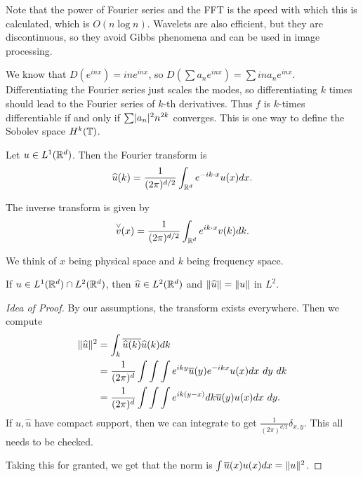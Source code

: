 \documentclass[10pt, twoside]{article}
\begin{document}
    Note that the power of Fourier series and the FFT is the speed with which
    this is calculated, which is $O(n \log n)$. Wavelets are also efficient,
    but they are discontinuous, so they avoid Gibbs phenomena and can be used
    in image processing.

    We know that $D(e^{inx}) = ine^{inx}$, so $D(\sum a_n e^{inx}) = \sum ina_n
    e^{inx}$. Differentiating the Fourier series just scales the modes, so
    differentiating $k$ times should lead to the Fourier series of $k$-th
    derivatives. Thus $f$ is $k$-times differentiable if and only if $\sum
    \lvert a_n\rvert^2 n^{2k}$ converges. This is one way to define the Sobolev space
    $H^k(\mathbb{T})$.

    \begin{defn} Let $u \in L^1(\mathbb{R}^d)$. Then the Fourier
        transform is \[\widehat{u}(k) = \frac{1}{(2\pi)^{d/2}} \int_{\mathbb{R}^d}
        e^{-ik\cdot x} u(x) dx.\]

        The inverse transform is given by \[ \overset{\vee}{v}(x) =
        \frac{1}{(2\pi)^{d/2}} \int_{\mathbb{R}^d} e^{ik\cdot x} v(k) dk. \] \end{defn}

    We think of $x$ being physical space and $k$ being frequency space.

    \begin{thm}[Plancharel] If $u \in L^1(\mathbb{R}^d) \cap L^2(\mathbb{R}^d)$, then
        $\widehat{u} \in L^2(\mathbb{R}^d)$ and $\lVert\widehat{u}\rVert = \lVert u\rVert$ in
        $L^2$.

        \begin{proof}[Idea of Proof] By our assumptions, the transform exists
            everywhere. Then we compute \begin{align*} \lVert\widehat{u}\rVert^2 &=
                \int_k \overline{\widehat{u}(k)} \widehat{u}(k) dk \\ &=
                \frac{1}{(2\pi)^d} \int \int \int e^{iky} \overline{u}(y)
                e^{-ikx} u(x) dx \ dy\ dk \\ &= \frac{1}{(2\pi)^d} \int \int
            \int e^{ik(y-x)} dk \overline{u}(y)u(x) dx \ dy.  \end{align*} If
            $u, \widehat{u}$ have compact support, then we can integrate to get
            $\frac{1}{(2\pi)^{d/2}} \delta_{x,y}$. This all needs to be
            checked.

            Taking this for granted, we get that the norm is $\int
        \overline{u}(x) u(x) dx = \lVert u\rVert^2$.  \end{proof} \end{thm}
\end{document}
